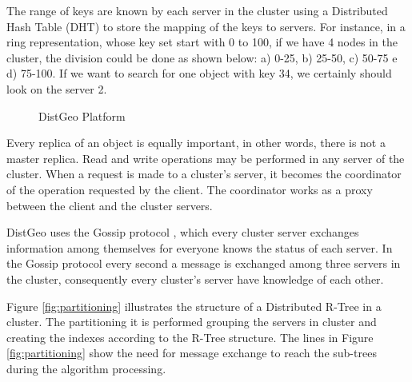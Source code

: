 The range of keys are known by each server in the cluster using a Distributed Hash Table (DHT) to store the mapping of the keys to servers. 
For instance, in a ring representation, whose key set start with 0 to 100, if we have 4 nodes in the cluster, the division could be done as shown below: 
a) 0-25, b) 25-50, c) 50-75 e d) 75-100. If we want to search for one object with key 34, we certainly should look on the server 2.

\begin{figure}[h]
  \centering
   \qquad
  \caption{DistGeo Platform}
  \label{fig:dist}
\end{figure}
	
Every replica of an object is equally important, in other words, there is not a master replica. Read and write operations may be performed in any server of the cluster. 
When a request is made to a cluster's server, it becomes the coordinator of the operation requested by the client. 
The coordinator works as a proxy between the client and the cluster servers. 
	
DistGeo uses the Gossip protocol \cite{demers1987epidemic}, which every cluster server exchanges information 
among themselves for everyone knows the status of each server. 
In the Gossip protocol every second a message is exchanged among three servers in the cluster, 
consequently every cluster's server have knowledge of each other. 

Figure \ref{fig:partitioning} illustrates the structure of a Distributed R-Tree in a cluster. 
The partitioning it is performed grouping the servers in cluster and creating the indexes according to the R-Tree structure. 
The lines in Figure \ref{fig:partitioning} show the need for message exchange to reach the sub-trees during the algorithm processing. 

